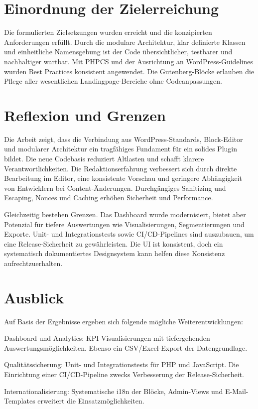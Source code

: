 \section{Einordnung der Zielerreichung}
Die formulierten Zielsetzungen wurden erreicht und die konzipierten Anforderungen erfüllt.
Durch die modulare Architektur, klar definierte Klassen und einheitliche Namensgebung ist der Code übersichtlicher, testbarer und nachhaltiger wartbar.
Mit PHPCS und der Ausrichtung an WordPress-Guidelines wurden Best Practices konsistent angewendet.
Die Gutenberg-Blöcke erlauben die Pflege aller wesentlichen Landingpage-Bereiche ohne Codeanpassungen.

\section{Reflexion und Grenzen}
Die Arbeit zeigt, dass die Verbindung aus WordPress-Standards, Block-Editor und modularer Architektur ein tragfähiges Fundament für ein solides Plugin bildet.
Die neue Codebasis reduziert Altlasten und schafft klarere Verantwortlichkeiten.
Die Redaktionserfahrung verbessert sich durch direkte Bearbeitung im Editor, eine konsistente Vorschau und geringere Abhängigkeit von Entwicklern bei Content-Änderungen.
Durchgängiges Sanitizing und Escaping, Nonces und Caching erhöhen Sicherheit und Performance.


Gleichzeitig bestehen Grenzen.
Das Dashboard wurde modernisiert, bietet aber Potenzial für tiefere Auswertungen wie Visualisierungen, Segmentierungen und Exporte.
Unit- und Integrationstests sowie CI/CD-Pipelines sind auszubauen, um eine Release-Sicherheit zu gewährleisten.
Die UI ist konsistent, doch ein systematisch dokumentiertes Designsystem kann helfen diese Konsistenz aufrechtzuerhalten.

\section{Ausblick}
Auf Basis der Ergebnisse ergeben sich folgende mögliche Weiterentwicklungen:

Dashboard und Analytics: KPI-Visualisierungen mit tiefergehenden Auswertungsmöglichkeiten. Ebenso ein CSV/Excel-Export der Datengrundlage.

Qualitätssicherung: Unit- und Integrationstests für PHP und JavaScript. Die Einrichtung einer CI/CD-Pipeline zwecks Verbesserung der Release-Sicherheit.

Internationalisierung: Systematische i18n der Blöcke, Admin-Views und E-Mail-Templates erweitert die Einsatzmöglichkeiten.


